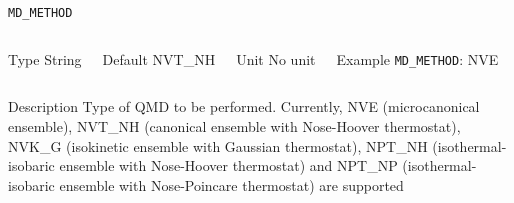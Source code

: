 \begin{frame}[allowframebreaks]{\texttt{MD\_METHOD}} \label{MD_METHOD}
\vspace*{-12pt}
\begin{columns}
\begin{block}{Type}
String
\end{block}

\begin{block}{Default}
NVT\_NH
\end{block}

\begin{block}{Unit}
No unit
\end{block}

\begin{block}{Example}
\texttt{MD\_METHOD}: NVE
\end{block}
\end{columns}

\begin{block}{Description}
Type of QMD to be performed. Currently, NVE (microcanonical ensemble), NVT\_NH (canonical ensemble with Nose-Hoover thermostat), NVK\_G (isokinetic ensemble with Gaussian thermostat), NPT\_NH (isothermal-isobaric ensemble with Nose-Hoover thermostat) and NPT\_NP (isothermal-isobaric ensemble with Nose-Poincare thermostat) are supported
\end{block}

\end{frame}



